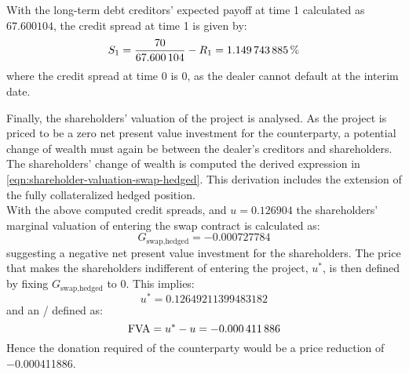 \documentclass[main.tex]{subfiles}
\begin{document}
            With the long-term debt creditors' expected payoff at time 1 calculated as $\num{67.600104}$,
            the credit spread at time 1 is given by:
            \begin{equation}
                S_1 =
                \frac{
                    \num{70}
                }{
                    \num{67.600104}
                }
                - R_{1}
                \nonumber
                = \pct{0.01149743885}
            \end{equation}
            where the credit spread at time 0 is 0,
            as the dealer cannot default at the interim date.
            
            Finally, the shareholders' valuation of the project is analysed.
            As the project is priced to be a zero net present value investment for the counterparty,
            a potential change of wealth must again be between the dealer's creditors and shareholders.
            The shareholders' change of wealth is computed the derived expression in \cref{eqn:shareholder-valuation-swap-hedged}.
            This derivation includes the extension of the fully collateralized hedged position.
            \\
            With the above computed credit spreads, and $u=\num{0.126904}$
            the shareholders' marginal valuation of entering the swap contract is calculated as:
            \begin{equation}
                G_{\text{swap,hedged}} = \num{-0.000727784}
            \end{equation}
            suggesting a negative net present value investment for the shareholders. 
            The price that makes the shareholders indifferent of entering the project, $u^{\ast}$, is then defined by fixing $G_{\text{swap,hedged}}$ to 0.
            This implies:
            \begin{equation}
                u^{\ast} = \num{0.12649211399483182}
            \end{equation}
            and an \FVA/ defined as:
            \begin{equation}
                \FVA/ = u^{\ast} - u = \num{-0.000411886}
            \end{equation}
            Hence the donation required of the counterparty would be a price reduction of \num{-0.000411886}.
            
\end{document}
